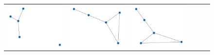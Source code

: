 \documentclass[11pt,a4paper,openright,oneside]{book}
\numberwithin{equation}{section}
\begin{document}
{\begin{figure}[h]
\begin{adjustwidth}{-3cm}{-3cm}
\begin{tabular}{>{\centering\arraybackslash}m{1.5cm} m{2.5cm} m{2.5cm} m{2.5cm} m{2.5cm} m{2.5cm}}
        \rule{0pt}{0.01cm} \includegraphics[width=\linewidth]{media/tnale/graph-1-tnale-0.5.png} \rule{0pt}{0.01cm}&
        \rule{0pt}{0.01cm} \includegraphics[width=\linewidth]{media/tnale/graph-2-tnale-0.5.png} \rule{0pt}{0.01cm}&
        \rule{0pt}{0.01cm} \includegraphics[width=\linewidth]{media/tnale/graph-3-tnale-0.5.png} \rule{0pt}{0.01cm}& 

\end{tabular}
\end{adjustwidth}
\end{figure}}
\end{document}
